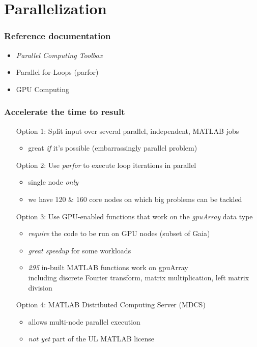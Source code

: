 \documentclass{beamer}
\begin{document}
\section{Parallelization}

\begin{frame}
  \frametitle{Reference documentation}
  \begin{itemize}
   \item \emph{Parallel Computing Toolbox} \hfill{}
   \item Parallel for-Loops (parfor) \hfill{}
   \item GPU Computing \hfill{}
  \end{itemize}
\end{frame}

\begin{frame}
  \frametitle{Accelerate the time to result}
  \begin{itemize}
   \setlength\itemsep{3ex}
   \item[Option 1:] Split input over several parallel, independent, MATLAB jobs
   \begin{itemize}
    \item great \emph{if} it's possible (embarrassingly parallel problem)
   \end{itemize}
   \pause
   \item[Option 2:] Use \emph{parfor} to execute loop iterations in parallel
   \begin{itemize}
    \item single node \emph{only}
    \item we have 120 \& 160 core nodes on which big problems can be tackled
   \end{itemize}
   \pause
   \item[Option 3:] Use GPU-enabled functions that work on the \emph{gpuArray} data type
   \begin{itemize}
    \item \emph{require} the code to be run on GPU nodes (subset of Gaia)
    \item \emph{great speedup} for some workloads
    \item \emph{295} in-built MATLAB functions work on gpuArray \\ { \tiny including discrete Fourier transform, matrix multiplication, left matrix division}
   \end{itemize}
   \pause
   \item[Option 4:] MATLAB Distributed Computing Server (MDCS)
   \begin{itemize}
    \item allows multi-node parallel execution
    \item \emph{not yet} part of the UL MATLAB license
   \end{itemize}
   \end{itemize}
\end{frame}
\end{document}
